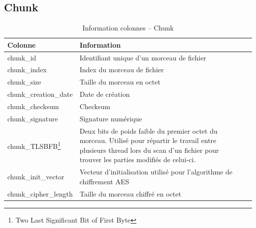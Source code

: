 \documentclass[a4paper,10pt, twoside]{report}
\begin{document}
\begin{spacing}{1.2}
\section{Chunk}
\begin{savenotes}
\begin{table}[h!]
  \centering
  \def\arraystretch{1.5}
  \setlength{\fboxsep}{13pt} %
  \setlength{\fboxrule}{0pt} %
  \begin{tabular}{lm{6cm}m{6cm}}
   \rowcolor{arkred} 
    \arrayrulecolor{gray73}\hline
    \color{white} \textbf{Colonne} & \color{white} \textbf{Information}\\
    \hline
    chunk\_id & Identifiant unique d'un morceau de fichier\\
    \hline
    chunk\_index & Index du morceau de fichier\\
    \hline
    chunk\_size & Taille du morceau en octet\\
    \hline
    chunk\_creation\_date & Date de cr\'eation\\
    \hline
    chunk\_checksum & Checksum\\
    \hline
    chunk\_signature & Signature num\'erique\\
    \hline
    chunk\_TLSBFB\footnote{Two Last Significant Bit of First Byte} & Deux bits
    de poids faible du premier octet du morceau. Utilis\'e pour r\'epartir le
    travail entre plusieurs thread lors du scan d'un fichier pour trouver les
    parties modifi\'es de celui-ci.\\
    \hline
    chunk\_init\_vector & Vecteur d'initialisation utilis\'e pour l'algorithme de
    chiffrement AES\\
    \hline
    chunk\_cipher\_length & Taille du morceau chiffr\'e en octet\\
  \end{tabular}
  \caption{\label{tabDBRMachine} Information colonnes -- Chunk}
\end{table}
\end{savenotes}

\end{spacing}
\end{document}
